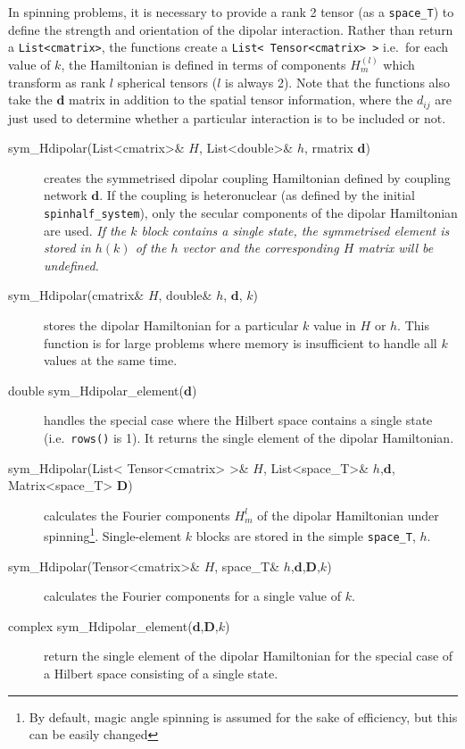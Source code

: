 \documentclass[11pt,a4paper]{article}
\newcommand{\bs}{\boldsymbol}
\begin{document}
In spinning problems, it is necessary to provide a rank 2 tensor (as a {\tt space\_T}) to define the strength and orientation of the dipolar interaction.
Rather than return a {\tt List<cmatrix>}, the functions create a {\tt List< Tensor<cmatrix> >} i.e.\ for each value of $k$, the Hamiltonian is defined in terms
of components $H^{(l)}_m$ which transform as rank $l$ spherical tensors ($l$ is always 2).
Note that the functions also take the $\bs{d}$ matrix in addition to the spatial
tensor information, where the $d_{ij}$ are just used to determine whether a
particular interaction is to be included or not.

\begin{description}
\item[sym\_Hdipolar(List<cmatrix>\& $H$, List<double>\& $h$, rmatrix $\bs{d}$)] creates
the symmetrised dipolar coupling Hamiltonian defined by coupling network $\bs{d}$.
If the coupling is heteronuclear (as defined by the initial {\tt spinhalf\_system}), only the
secular components of the dipolar Hamiltonian are used.
\emph{If the $k$ block contains a
single state, the symmetrised element is stored in $h(k)$ of the $h$ vector
and the corresponding $H$ matrix will be undefined.}

\item[sym\_Hdipolar(cmatrix\& $H$, double\& $h$, $\bs{d}$, $k$)] stores the dipolar Hamiltonian for a particular $k$ value in $H$ or $h$.  This function is for large
problems where memory is insufficient to handle all $k$ values at the same time.
\item[double sym\_Hdipolar\_element($\bs{d}$)] handles the special case where the Hilbert space contains
a single state (i.e.\ {\tt rows()} is 1).  It returns the single element of the dipolar Hamiltonian.
\item[sym\_Hdipolar(List< Tensor<cmatrix> >\& $H$, List<space\_T>\& $h$,$\bs{d}$, Matrix<space\_T> $\bs{D}$)] calculates the Fourier components $H^{l}_m$ of the dipolar
Hamiltonian under spinning\footnote{By default, magic angle spinning is assumed for the sake of efficiency, but this can be easily changed}.  Single-element $k$ blocks are stored in the simple {\tt space\_T}, $h$.
\item[sym\_Hdipolar(Tensor<cmatrix>\& $H$, space\_T\& $h$,$\bs{d}$,$\bs{D}$,$k$)] calculates the Fourier components for a single value of $k$.
\item[complex sym\_Hdipolar\_element($\bs{d}$,$\bs{D}$,$k$)] return the single element of
the dipolar Hamiltonian for the special case of a Hilbert space consisting of a single state.
\end{description}
\end{document}
